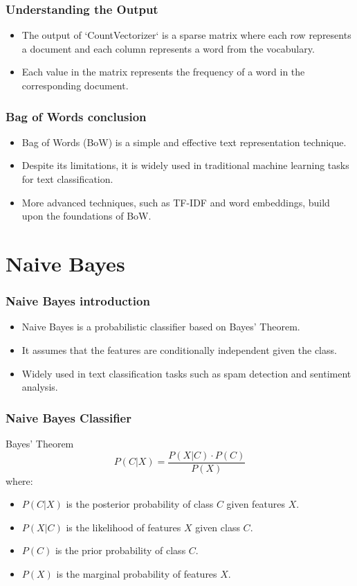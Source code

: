 \documentclass{beamer}
\begin{document}
\begin{frame}
    \frametitle{Understanding the Output}
    \begin{itemize}
        \item The output of `CountVectorizer` is a sparse matrix where each row represents a document and each column represents a word from the vocabulary.
        \item Each value in the matrix represents the frequency of a word in the corresponding document.
    \end{itemize}
\end{frame}

\begin{frame}
    \frametitle{Bag of Words conclusion}
    \begin{itemize}
        \item Bag of Words (BoW) is a simple and effective text representation technique.
        \item Despite its limitations, it is widely used in traditional machine learning tasks for text classification.
        \item More advanced techniques, such as TF-IDF and word embeddings, build upon the foundations of BoW.
    \end{itemize}
\end{frame}


\section{Naive Bayes}

\begin{frame}
    \frametitle{Naive Bayes introduction}
    \begin{itemize}
        \item Naive Bayes is a probabilistic classifier based on Bayes' Theorem.
        \item It assumes that the features are conditionally independent given the class.
        \item Widely used in text classification tasks such as spam detection and sentiment analysis.
    \end{itemize}
\end{frame}

\begin{frame}
    \frametitle{Naive Bayes Classifier}
    \begin{block}{Bayes' Theorem}
        \[
        P(C | X) = \frac{P(X | C) \cdot P(C)}{P(X)}
        \]
        where:
        \begin{itemize}
            \item \( P(C | X) \) is the posterior probability of class \( C \) given features \( X \).
            \item \( P(X | C) \) is the likelihood of features \( X \) given class \( C \).
            \item \( P(C) \) is the prior probability of class \( C \).
            \item \( P(X) \) is the marginal probability of features \( X \).
        \end{itemize}
    \end{block}
\end{frame}
\end{document}
